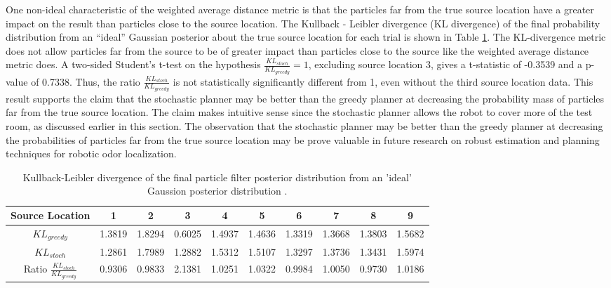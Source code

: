 \documentclass[submit, 12pt]{aiaa-pretty-modified}
\begin{document}
One non-ideal characteristic of the weighted average distance metric
is that the particles far from the true source location have a greater
impact on the result than particles close to the source location.
The Kullback - Leibler divergence (KL divergence) of the final
probability distribution from an ``ideal'' Gaussian posterior about
the true source location for each trial is shown in Table
\ref{tab:kl-ideal}.  The KL-divergence metric does not allow particles far from
the source to be of greater impact than particles close to the source
like the weighted average distance metric does.  A
two-sided Student's t-test on the hypothesis
$\frac{KL_{stoch}}{KL_{greedy}} = 1$, excluding source location 3, gives a t-statistic of -0.3539 and
a p-value of 0.7338.  Thus, the ratio $\frac{KL_{stoch}}{KL_{greedy}}$
is not statistically significantly different from 1, even without the
third source location data.  This result supports the claim that the
stochastic planner may be better than the greedy planner at decreasing the probability mass of
particles far from the true source location.  The claim makes
intuitive sense since the stochastic planner allows the robot to cover
more of the test room, as discussed earlier in this section.  The
observation that the stochastic planner may be better than the greedy
planner at decreasing the probabilities of particles far from the true
source location may be prove valuable in future research on robust
estimation and planning techniques for robotic odor localization.


\begin{table}[htb]
\begin{center}
\begin{tabular}{|c||c||c||c||c||c||c||c||c||c|}
\hline
 Source Location & 1 & 2 & 3 & 4 & 5 & 6 & 7 & 8 & 9 \\
\hline \hline
$KL_{greedy}$ & 1.3819 & 1.8294 & 0.6025 & 1.4937 & 1.4636 & 1.3319 & 1.3668 & 1.3803 & 1.5682 \\
\hline
$KL_{stoch}$  & 1.2861 & 1.7989 & 1.2882 & 1.5312 & 1.5107 & 1.3297 & 1.3736 & 1.3431 & 1.5974 \\
\hline
Ratio $\frac{KL_{stoch}}{KL_{greedy}}$ & 0.9306 & 0.9833 & 2.1381 & 1.0251 & 1.0322 & 0.9984 & 1.0050 & 0.9730 & 1.0186 \\
\hline
\end{tabular}
\caption{Kullback-Leibler divergence of the final particle filter
  posterior distribution from an 'ideal' Gaussion posterior distribution . }
\label{tab:kl-ideal}
\end{center}
\end{table}
\end{document}
